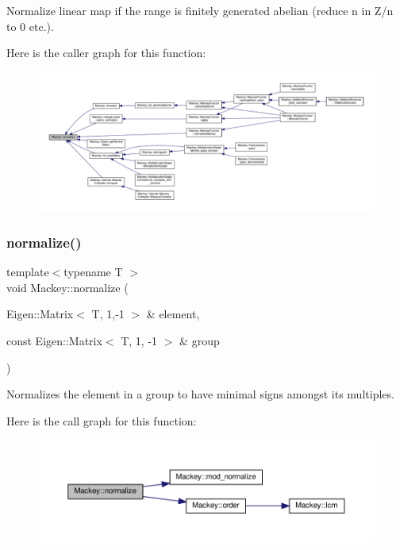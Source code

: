 Normalize linear map if the range is finitely generated abelian (reduce n in Z/n to 0 etc.). 

Here is the caller graph for this function\+:\nopagebreak
\begin{figure}[H]
\begin{center}
\leavevmode
\includegraphics[width=350pt]{namespaceMackey_a5ae32d04bca298d2d8735635ae45b971_icgraph}
\end{center}
\end{figure}
\mbox{\label{namespaceMackey_a635c87980358b97256fe159f0c59bb80}} 
\subsubsection{\texorpdfstring{normalize()}{normalize()}\hspace{0.1cm}{\footnotesize\ttfamily [2/2]}}
{\footnotesize\ttfamily template$<$typename T $>$ \\
void Mackey\+::normalize (\begin{DoxyParamCaption}\item[{Eigen\+::\+Matrix$<$ T, 1,-\/1 $>$ \&}]{element,  }\item[{const Eigen\+::\+Matrix$<$ T, 1, -\/1 $>$ \&}]{group }\end{DoxyParamCaption})}



Normalizes the element in a group to have minimal signs amongst its multiples. 

Here is the call graph for this function\+:\nopagebreak
\begin{figure}[H]
\begin{center}
\leavevmode
\includegraphics[width=350pt]{namespaceMackey_a635c87980358b97256fe159f0c59bb80_cgraph}
\end{center}
\end{figure}
\mbox{\label{namespaceMackey_a463bb762b4edc2f283e8d1c0c466aedf}} 
